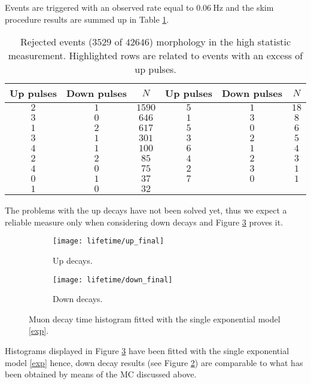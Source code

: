 Events are triggered with an observed rate equal to $\SI{0.06}{\hertz}$ and the skim procedure results are summed up in Table \ref{tab:final}.
\begin{table}[!htp]
	\centering
	\begin{tabular}{ccc||ccc}
		\toprule
		Up pulses & Down pulses & $N$ & Up pulses & Down pulses & $N$\\
		\midrule
		\rowcolor{blue!25}$2$&$1$&$1590$&$5$&$1$&$18$\\
		\cellcolor{blue!25}$3$&\cellcolor{blue!25}$0$&\cellcolor{blue!25}$646$&$1$&$3$&$8$\\
		$1$&$2$&$617$&\cellcolor{blue!25}$5$&\cellcolor{blue!25}$0$&\cellcolor{blue!25}$6$\\ 
		\rowcolor{blue!25}$3$&$1$&$301$&$3$&$2$&$5$\\ 
		\rowcolor{blue!25}$4$&$1$&$100$&$6$&$1$&$4$\\ 
		\rowcolor{blue!25}$2$&$2$&$85$&$4$&$2$&$3$\\ 
		\rowcolor{blue!25}$4$&$0$&$75$&$2$&$3$&$1$\\ 
		$0$&$1$&$37$&\cellcolor{blue!25}$7$&\cellcolor{blue!25}$0$&\cellcolor{blue!25}$1$\\ 
		$1$&$0$&$32$ &&&\\		
		\bottomrule		
	\end{tabular}
	\caption{Rejected events ($3529$ of $42646$) morphology in the high statistic measurement. Highlighted rows are related to events with an excess of up pulses.}\label{tab:final}
\end{table}
The problems with the up decays have not been solved yet, thus we expect a reliable measure only when considering down decays and Figure \ref{fig:final} proves it.
\begin{figure}[!htp]
	\centering
	\begin{subfigure}{.5\linewidth}
		\centering
		\texttt{[image: lifetime/up\_final]}
		\caption{Up decays.}\label{subfig:final_up}
	\end{subfigure}\hfill
	\begin{subfigure}{.5\linewidth}
		\centering
		\texttt{[image: lifetime/down\_final]}
		\caption{Down decays.}\label{subfig:final_down}
	\end{subfigure}
	\caption{Muon decay time histogram fitted with the single exponential model \eqref{exp}.}\label{fig:final}
\end{figure}
Histograms displayed in Figure \ref{fig:final} have been fitted with the single exponential model \eqref{exp} hence, down decay results (see Figure \ref{subfig:final_down}) are comparable to what has been obtained by means of the MC discussed above.

